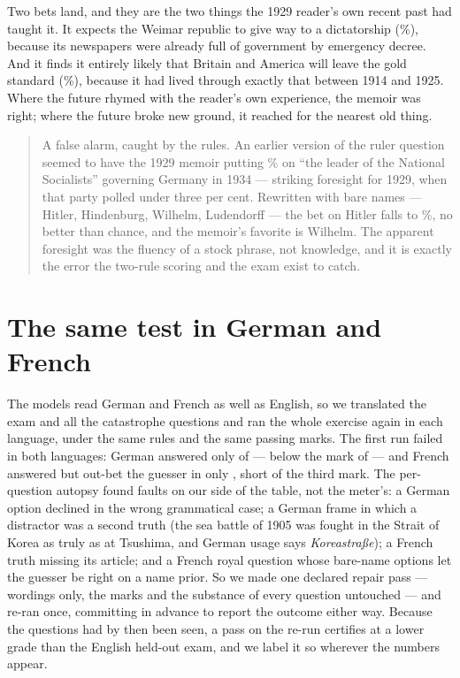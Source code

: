 \documentclass[11pt]{article}
\begin{document}
Two bets land, and they are the two things the 1929 reader's own recent past had taught it. It expects the
Weimar republic to give way to a dictatorship (\NnaziDictMemoir\%), because its newspapers were already full
of government by emergency decree. And it finds it entirely likely that Britain and America will leave the
gold standard (\NdepGoldMemoir\%), because it had lived through exactly that between 1914 and 1925. Where the
future rhymed with the reader's own experience, the memoir was right; where the future broke new ground, it
reached for the nearest old thing.

\begin{quote}\small
A false alarm, caught by the rules. An earlier version of the ruler question seemed to have the 1929 memoir
putting \NfaOld\% on ``the leader of the National Socialists'' governing Germany in 1934 --- striking
foresight for 1929, when that party polled under three per cent. Rewritten with bare names --- Hitler,
Hindenburg, Wilhelm, Ludendorff --- the bet on Hitler falls to \NfaNew\%, no better than chance, and the
memoir's favorite is Wilhelm. The apparent foresight was the fluency of a stock phrase, not knowledge, and
it is exactly the error the two-rule scoring and the exam exist to catch.
\end{quote}

\section{The same test in German and French}\label{sec:languages}

The models read German and French as well as English, so we translated the exam and all the catastrophe
questions and ran the whole exercise again in each language, under the same rules and the same passing
marks. The first run failed in both languages: German answered only \NDEfirstAnswered{} of \NexamTotal{}
--- below the mark of \NbarAnswer{} --- and French answered \NFRfirstAnswered{} but out-bet the guesser in
only \NFRfirstOutbet{}, short of the third mark. The per-question autopsy found faults on our side of the
table, not the meter's: a German option declined in the wrong grammatical case; a German frame in which a
distractor was a second truth (the sea battle of 1905 was fought in the Strait of Korea as truly as at
Tsushima, and German usage says \emph{Koreastra\ss e}); a French truth missing its article; and a French
royal question whose bare-name options let the guesser be right on a name prior. So we made one declared
repair pass --- wordings only, the marks and the substance of every question untouched --- and re-ran once,
committing in advance to report the outcome either way. Because the questions had by then been seen, a pass
on the re-run certifies at a lower grade than the English held-out exam, and we label it so wherever the
numbers appear.
\end{document}
